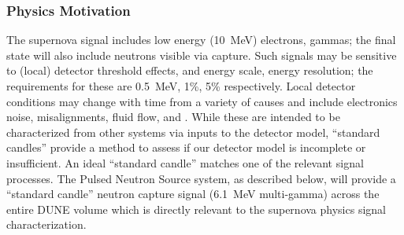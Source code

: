 \subsubsection{Physics Motivation}
\label{sec:sp-calib-sys-pns-phys} 

The supernova signal includes low energy (10~MeV) electrons, gammas; the final state will also include neutrons visible via capture. Such signals may be sensitive to (local) detector threshold effects, and energy scale, energy resolution; the requirements for these are 0.5~MeV, 1\%, 5\% respectively. Local detector conditions may change with time from a variety of 
causes and include electronics noise, misalignments, fluid flow, and \efield. While these are intended to be characterized from other systems via inputs to the detector model, ``standard candles'' provide a method to assess if our detector model is incomplete or insufficient. An ideal ``standard candle'' matches one of the relevant signal processes. The Pulsed Neutron Source system, as described below, will provide a ``standard candle'' neutron capture signal (6.1~MeV multi-gamma) across the entire DUNE volume which is directly relevant to the supernova physics signal characterization.




